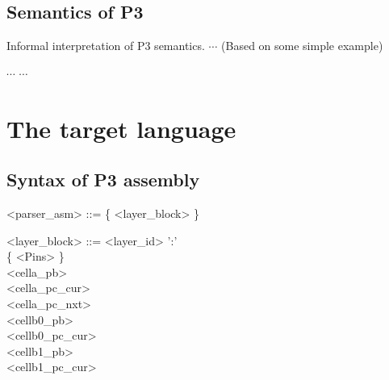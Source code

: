 \documentclass{article}
\begin{document}
\subsection{Semantics of P3}

Informal interpretation of P3 semantics. $\cdots$ (Based on some simple example)

\begin{flushleft} 
$\cdots$ $\cdots$
\end{flushleft} 

\section{The target language}

\subsection{Syntax of P3 assembly}

\begin{grammar} \small

{\renewcommand\baselinestretch{0}\selectfont
<parser\_asm>   ::= \{ <layer\_block> \}

<layer\_block>     ::=   <layer\_id> ':'   \\
     \hspace*{1.78cm}    \{ <Pins> \}    \\
     \hspace*{1.78cm}    <cella\_pb>    \\
     \hspace*{1.78cm}    <cella\_pc\_cur>   \\
     \hspace*{1.78cm}    <cella\_pc\_nxt>  \\
     \hspace*{1.78cm}    <cellb0\_pb>   \\
     \hspace*{1.78cm}    <cellb0\_pc\_cur>   \\
     \hspace*{1.78cm}    <cellb1\_pb>    \\
     \hspace*{1.78cm}    <cellb1\_pc\_cur>

\par}

\end{grammar}
\end{document}
